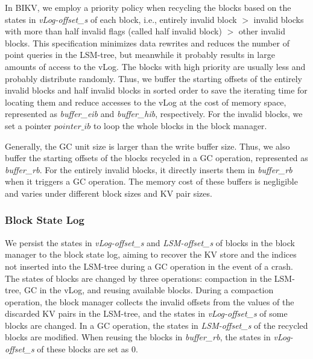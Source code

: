 \documentclass[sigconf]{acmart}
\begin{document}
In BIKV, we employ a priority policy when recycling the blocks based on the states in \textit{vLog-offset\_s} of each block, i.e., entirely invalid block $>$ invalid blocks with more than half invalid flags (called half invalid block) $>$ other invalid blocks. This specification minimizes data rewrites and reduces the number of point queries in the LSM-tree, but meanwhile it probably results in large amounts of access to the vLog. The blocks with high priority are usually less and probably distribute randomly. Thus, we buffer the starting offsets of the entirely invalid blocks and half invalid blocks in sorted order to save the iterating time for locating them and reduce accesses to the vLog at the cost of memory space, represented as \textit{buffer\_eib} and \textit{buffer\_hib}, respectively. For the invalid blocks, we set a pointer $pointer\_ib$ to loop the whole blocks in the block manager.

Generally, the GC unit size is larger than the write buffer size. Thus, we also buffer the starting offsets of the blocks recycled in a GC operation, represented as \textit{buffer\_rb}. For the entirely invalid blocks, it directly inserts them in \textit{buffer\_rb} when it triggers a GC operation. The memory cost of these buffers is negligible and varies under different block sizes and KV pair sizes. 

\subsubsection{Block State Log}
We persist the states in \textit{vLog-offset\_s} and \textit{LSM-offset\_s} of blocks in the block manager to the block state log, aiming to recover the KV store and the indices not inserted into the LSM-tree during a GC operation in the event of a crash. The states of blocks are changed by three operations: compaction in the LSM-tree, GC in the vLog, and reusing available blocks. During a compaction operation, the block manager collects the invalid offsets from the values of the discarded KV pairs in the LSM-tree, and the states in \textit{vLog-offset\_s} of some blocks are changed. In a GC operation, the states in \textit{LSM-offset\_s} of the recycled blocks are modified. When reusing the blocks in \textit{buffer\_rb}, the states in \textit{vLog-offset\_s} of these blocks are set as 0. 
\end{document}
